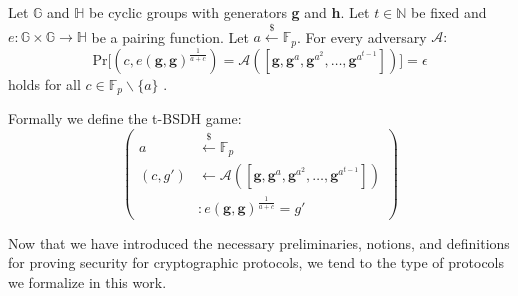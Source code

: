 \begin{definition}
    \label{tBSDH_def}
    Let $\mathbb{G}$ and $\mathbb{H}$ be cyclic groups with generators \textbf{g} and \textbf{h}.
    Let $t \in \mathbb{N}$ be fixed and $e: \mathbb{G} \times \mathbb{G} \rightarrow \mathbb{H}$ be a pairing function.  Let $a \overset{{\scriptscriptstyle\$}}{\leftarrow} \mathbb{F}_p$. For every adversary $\mathcal{A}:$
    \begin{equation*}
        \text{Pr}\big[
            (c,e(\textbf{g}, \textbf{g} )^{\frac{1}{a+c}}) = \mathcal{A}([\textbf{g},\textbf{g}^a,\textbf{g}^{a^2},\dots, \textbf{g}^{a^{t-1}}])
        \big] = \epsilon
    \end{equation*}
    holds for all $c \in \mathbb{F}_p\backslash \{a\}$ \parencite{KZG}.
    
    Formally we define the t-BSDH game: 
    \begin{equation*}
        \left(
            \begin{aligned}
                a & \overset{{\scriptscriptstyle\$}}{\leftarrow} \mathbb{F}_p \\
                (c,g') & \leftarrow \mathcal{A}([\textbf{g},\textbf{g}^a,\textbf{g}^{a^2},\dots, \textbf{g}^{a^{t-1}}]) \\
                & : e(\textbf{g}, \textbf{g})^{\frac{1}{a+c}} = g'
            \end{aligned}
        \right)
    \end{equation*}
\end{definition}

Now that we have introduced the necessary preliminaries, notions, and definitions for proving security for cryptographic protocols, we tend to the type of protocols we formalize in this work.


